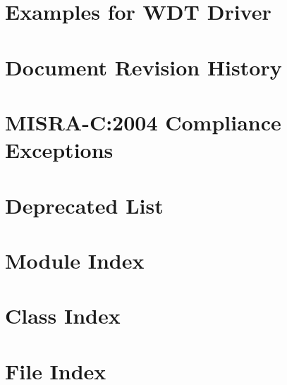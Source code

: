\documentclass[twoside]{book}
\newcommand{\+}{\discretionary{\mbox{\scriptsize$\hookleftarrow$}}{}{}}
\begin{document}
\chapter{Examples for WDT Driver}
\label{asfdoc_sam0_wdt_exqsg}

\chapter{Document Revision History}
\label{asfdoc_sam0_wdt_document_revision_history}

\chapter{MISRA-\/C\+:2004 Compliance Exceptions}
\label{_c_m_s_i_s__m_i_s_r_a__exceptions}

\chapter{Deprecated List}
\label{deprecated}

\chapter{Module Index}

\chapter{Class Index}

\chapter{File Index}

\end{document}
